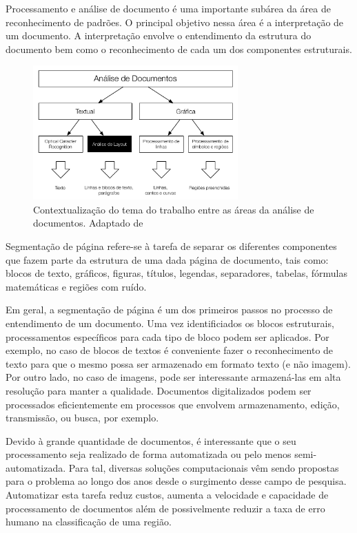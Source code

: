 \documentclass[a4paper,11pt]{article}
\begin{document}
Processamento e análise de documento é uma importante subárea da área
de reconhecimento de padrões. O principal objetivo nessa área é a
interpretação de um documento. A interpretação envolve o entendimento
da estrutura do documento bem como o reconhecimento de cada um dos
componentes estruturais.

\begin{figure}[htb]
\begin{center}
\includegraphics[width=0.7\textwidth]{assets/document_processing_areas_hierarquies.pdf}
\end{center}
\caption{Contextualização do tema do trabalho entre as áreas da
  análise de documentos. Adaptado de~\cite{Kasturi_OGorman_Govindaraju_2002}}
\label{fig:context1}
\end{figure}

Segmentação de página refere-se à tarefa de separar os diferentes
componentes que fazem parte da estrutura de uma dada página de
documento, tais como: blocos de texto, gráficos, figuras, títulos,
legendas, separadores, tabelas, fórmulas matemáticas e regiões com
ruído.

Em geral, a segmentação de página é um dos primeiros passos no
processo de entendimento de um documento. Uma vez identificiados os
blocos estruturais, processamentos específicos para cada tipo de bloco
podem ser aplicados. Por exemplo, no caso de blocos de textos é
conveniente fazer o reconhecimento de texto para que o mesmo possa ser
armazenado em formato texto (e não imagem). Por outro lado, no caso de
imagens, pode ser interessante armazená-las em alta resolução para
manter a qualidade. Documentos digitalizados podem ser processados
eficientemente em processos que envolvem armazenamento, edição,
transmissão, ou busca, por exemplo.

Devido à grande quantidade de documentos, é interessante que o seu
processamento seja realizado de forma automatizada ou pelo menos
semi-automatizada. Para tal, diversas soluções computacionais vêm
sendo propostas para o problema ao longo dos anos desde o surgimento
desse campo de pesquisa. Automatizar esta tarefa reduz custos, aumenta
a velocidade e capacidade de processamento de documentos além de
possivelmente reduzir a taxa de erro humano na classificação de uma
região.
\end{document}
